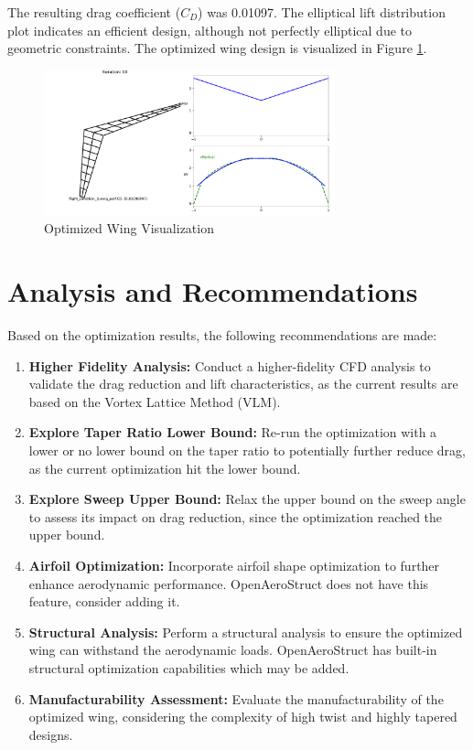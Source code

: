 \documentclass{article}
\begin{document}
The resulting drag coefficient ($C_D$) was 0.01097. The elliptical lift distribution plot indicates an efficient design, although not perfectly elliptical due to geometric constraints.  The optimized wing design is visualized in Figure \ref{fig:Optimized_Wing}.

\begin{figure}[h!]
    \centering
    \includegraphics[width=0.75\textwidth]{./Figures/Optimized_Wing.pdf}
    \caption{Optimized Wing Visualization}
    \label{fig:Optimized_Wing}
\end{figure}

\section{Analysis and Recommendations}
Based on the optimization results, the following recommendations are made:
\begin{enumerate}
    \item \textbf{Higher Fidelity Analysis:} Conduct a higher-fidelity CFD analysis to validate the drag reduction and lift characteristics, as the current results are based on the Vortex Lattice Method (VLM).
    \item \textbf{Explore Taper Ratio Lower Bound:} Re-run the optimization with a lower or no lower bound on the taper ratio to potentially further reduce drag, as the current optimization hit the lower bound.
    \item \textbf{Explore Sweep Upper Bound:} Relax the upper bound on the sweep angle to assess its impact on drag reduction, since the optimization reached the upper bound.
    \item \textbf{Airfoil Optimization:} Incorporate airfoil shape optimization to further enhance aerodynamic performance. OpenAeroStruct does not have this feature, consider adding it.
    \item \textbf{Structural Analysis:} Perform a structural analysis to ensure the optimized wing can withstand the aerodynamic loads. OpenAeroStruct has built-in structural optimization capabilities which may be added.
    \item \textbf{Manufacturability Assessment:} Evaluate the manufacturability of the optimized wing, considering the complexity of high twist and highly tapered designs.
\end{enumerate}
\end{document}
